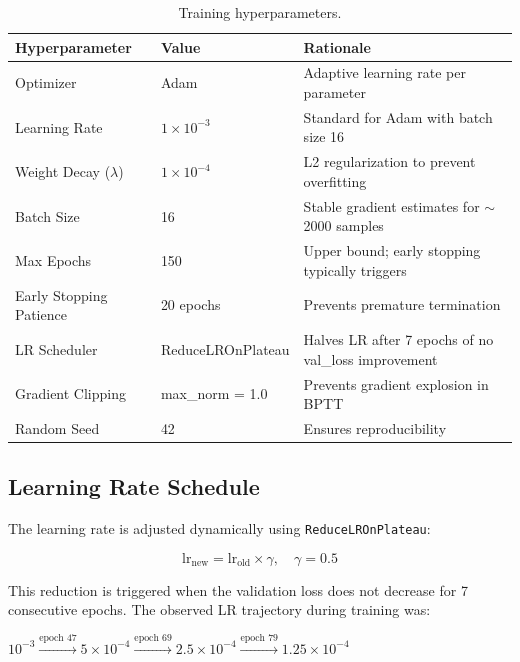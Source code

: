 \documentclass[12pt, a4paper]{article}
\begin{document}
\begin{table}[H]
    \centering
    \caption{Training hyperparameters.}
    \label{tab:hyperparams}
    \begin{tabular}{lll}
        \toprule
        \textbf{Hyperparameter} & \textbf{Value} & \textbf{Rationale} \\
        \midrule
        Optimizer & Adam & Adaptive learning rate per parameter \\
        Learning Rate & $1 \times 10^{-3}$ & Standard for Adam with batch size 16 \\
        Weight Decay ($\lambda$) & $1 \times 10^{-4}$ & L2 regularization to prevent overfitting \\
        Batch Size & 16 & Stable gradient estimates for $\sim$2000 samples \\
        Max Epochs & 150 & Upper bound; early stopping typically triggers \\
        Early Stopping Patience & 20 epochs & Prevents premature termination \\
        LR Scheduler & ReduceLROnPlateau & Halves LR after 7 epochs of no val\_loss improvement \\
        Gradient Clipping & max\_norm = 1.0 & Prevents gradient explosion in BPTT \\
        Random Seed & 42 & Ensures reproducibility \\
        \bottomrule
    \end{tabular}
\end{table}

\subsection{Learning Rate Schedule}

The learning rate is adjusted dynamically using \texttt{ReduceLROnPlateau}:

\begin{equation}
    \text{lr}_{\text{new}} = \text{lr}_{\text{old}} \times \gamma, \quad \gamma = 0.5
    \label{eq:lr_schedule}
\end{equation}

This reduction is triggered when the validation loss does not decrease for 7 consecutive epochs. The observed LR trajectory during training was:

\begin{center}
    $10^{-3} \xrightarrow{\text{epoch 47}} 5 \times 10^{-4} \xrightarrow{\text{epoch 69}} 2.5 \times 10^{-4} \xrightarrow{\text{epoch 79}} 1.25 \times 10^{-4}$
\end{center}
\end{document}
